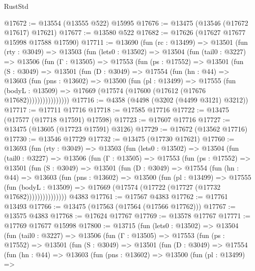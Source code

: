 \begin{lexlean}{RustStd}
\begin{coremodule}
@17672 := @13554 (@13555 @522) @15995
@17676 := @13475 (@13546 (@17672 @17617) @17621)
@17677 := @13580 @522
@17682 := @17626 (@17627 @17677 @15998 @17588 @17590)
@17711 := @13690
    (fun (rc : @13499) =>
    @13501
      (fun (rty : @3049) =>
      @13503
        (fun (lets0 : @13502) =>
        @13504
          (fun (tail0 : @3227) =>
          @13506
            (fun (Γ : @13505) =>
            @17553
              (fun (ps : @17552) =>
              @13501
                (fun (S : @3049) =>
                @13501
                  (fun (D : @3049) =>
                  @17554
                    (fun (hn : @44) =>
                    @13603
                      (fun (pns : @13602) =>
                      @13500
                        (fun (pl : @13499) =>
                        @17555
                          (fun (bodyL : @13509) =>
                          @17669 (@17574 (@17600 (@17612 (@17676 @17682))))))))))))))))
@17716 := @4358 (@4498 (@3202 (@4499 @3121) @3212))
@17717 := @17711 @17716
@17718 := @17585 @17716
@17722 := @13475 (@17577 (@17718 @17591) @17598)
@17723 := @17607 @17716
@17727 := @13475 (@13605 (@17723 @17591) @3126)
@17729 := @17672 (@13562 @17716)
@17730 := @13546 @17729
@17732 := @13475 (@17730 @17621)
@17760 := @13693
    (fun (rty : @3049) =>
    @13503
      (fun (lets0 : @13502) =>
      @13504
        (fun (tail0 : @3227) =>
        @13506
          (fun (Γ : @13505) =>
          @17553
            (fun (ps : @17552) =>
            @13501
              (fun (S : @3049) =>
              @13501
                (fun (D : @3049) =>
                @17554
                  (fun (hn : @44) =>
                  @13603
                    (fun (pns : @13602) =>
                    @13500
                      (fun (pl : @13499) =>
                      @17555
                        (fun (bodyL : @13509) =>
                        @17669 (@17574 (@17722 (@17727 (@17732 @17682)))))))))))))))
    @4383
@17761 := @17567 @4383
@17762 := @17761 @13493
@17766 := @13475 (@17563 (@17564 (@17566 @17762)))
@17767 := @13575 @4383
@17768 := @17624 @17767
@17769 := @13578 @17767
@17771 := @17769 @17677 @15998
@17800 := @13715
    (fun (lets0 : @13502) =>
    @13504
      (fun (tail0 : @3227) =>
      @13506
        (fun (Γ : @13505) =>
        @17553
          (fun (ps : @17552) =>
          @13501
            (fun (S : @3049) =>
            @13501
              (fun (D : @3049) =>
              @17554
                (fun (hn : @44) =>
                @13603
                  (fun (pns : @13602) =>
                  @13500
                    (fun (pl : @13499) =>

\end{coremodule}
\end{lexlean}

